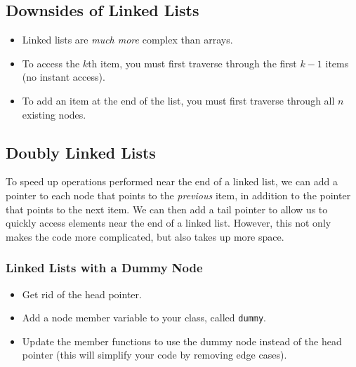 \documentclass[class=article, crop=false]{standalone}
\begin{document}
  \subsection{Downsides of Linked Lists}
  \begin{itemize}
    \item Linked lists are \emph{much more} complex than arrays.
    \item To access the $k$th item, you must first traverse through the first $k-1$ items (no instant access).
    \item To add an item at the end of the list, you must first traverse through all $n$ existing nodes.
  \end{itemize}
  \subsection{Doubly Linked Lists}
  To speed up operations performed near the end of a linked list, we can add a pointer to each node that points to the \emph{previous} item, in addition to the pointer that points to the next item. We can then add a tail pointer to allow us to quickly access elements near the end of a linked list. However, this not only makes the code more complicated, but also takes up more space.
  \subsubsection{Linked Lists with a Dummy Node}
  \begin{itemize}
    \item Get rid of the head pointer.
    \item Add a node member variable to your class, called \texttt{dummy}.
    \item Update the member functions to use the dummy node instead of the head pointer (this will simplify your code by removing edge cases).
  \end{itemize}
\end{document}
